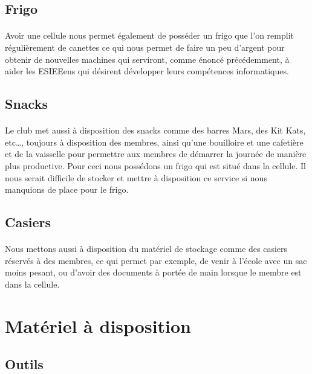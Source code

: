 \documentclass[11pt]{report}
\begin{document}
\subsection{Frigo}

\paragraph{} Avoir une cellule nous permet également de posséder un frigo que
l'on remplit régulièrement de canettes ce qui nous permet de faire un peu
d'argent pour obtenir de nouvelles machines qui serviront, comme énoncé
précédemment, à aider les ESIEEens qui désirent développer leurs compétences
informatiques.

\subsection{Snacks}

\paragraph{} Le club met aussi à disposition des snacks comme des barres Mars,
des Kit Kats, etc\ldots, toujours à disposition des membres, ainsi qu'une
bouilloire et une cafetière et de la vaisselle pour permettre aux membres de
démarrer la journée de manière plus productive. Pour ceci nous possédons un
frigo qui est situé dans la cellule. Il nous serait difficile de stocker et
mettre à disposition ce service si nous manquions de place pour le frigo.

\subsection{Casiers}

\paragraph{} Nous mettons aussi à disposition du matériel de stockage comme des
casiers réservés à des membres, ce qui permet par exemple, de venir à l'école
avec un sac moins pesant, ou d'avoir des documents à portée de main lorsque le
membre est dans la cellule.

\section{Matériel à disposition}

\subsection{Outils}
\end{document}
